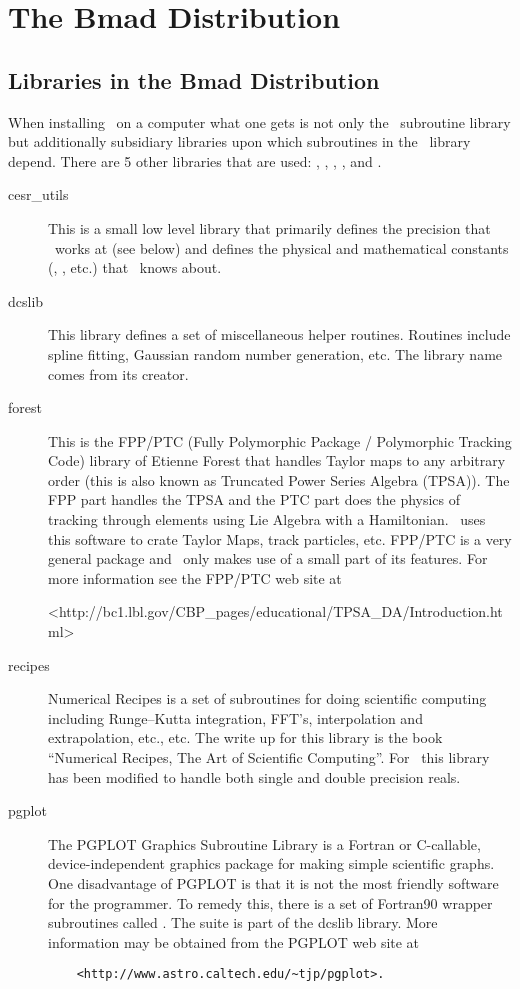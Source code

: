 \chapter{The Bmad Distribution}

\section{Libraries in the Bmad Distribution}

When installing \bmad\ on a computer what one gets is not only the
\bmad\ subroutine library but additionally subsidiary libraries upon
which subroutines in the \bmad\ library depend. There are 5 other
libraries that are used: , ,
, , and .
\begin{description}
\item[cesr\_utils] This is a small low level library that primarily defines 
the precision that \bmad\ works at (see below) and defines the physical
and mathematical constants (, , etc.) that \bmad\ knows
about.
\item[dcslib] This library defines a set of miscellaneous helper routines. 
Routines include spline fitting, Gaussian random number generation,
etc. The library name comes from its creator.
\item[forest] This is the FPP/PTC 
(Fully Polymorphic Package / Polymorphic Tracking Code) library of
Etienne Forest that handles Taylor maps to any arbitrary order (this
is also known as Truncated Power Series Algebra (TPSA)). The FPP part
handles the TPSA and the PTC part does the physics of tracking through
elements using Lie Algebra with a Hamiltonian.  \bmad\ uses this
software to crate Taylor Maps, track particles, etc.  FPP/PTC is a
very general package and \bmad\ only makes use of a small part of its
features. For more information see the FPP/PTC web site at
\begin{example} 
    <http://bc1.lbl.gov/CBP_pages/educational/TPSA_DA/Introduction.html>
\end{example}
\item[recipes] Numerical Recipes is a set of subroutines for doing 
scientific computing including Runge--Kutta integration, FFT's,
interpolation and extrapolation, etc., etc. The write up for this
library is the book ``Numerical Recipes, The Art of Scientific
Computing''\cite{?}. For \bmad\ this library has been modified to handle
both single and double precision reals.
\item[pgplot] The PGPLOT Graphics Subroutine Library is a Fortran or 
C-callable, device-independent graphics package for making simple
scientific graphs.  One disadvantage of PGPLOT is that it is not the
most friendly software for the programmer. To remedy this, there is a
set of Fortran90 wrapper subroutines called . The
 suite is part of the dcslib library. More information
may be obtained from the PGPLOT web site at
\begin{verbatim}
    <http://www.astro.caltech.edu/~tjp/pgplot>.
\end{verbatim}

\end{description}

